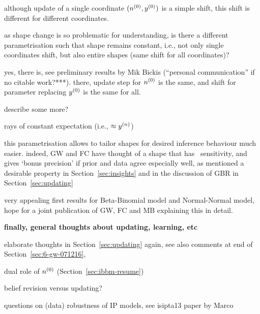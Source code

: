 although update of a single coordinate $(n^{(0)},y^{(0)})$ is a simple shift,
this shift is different for different coordinates.

as shape change is so problematic for understanding,
is there a different parametrisation such that shape remains constant,
i.e., not only single coordinates shift, but also entire shapes
(same shift for all coordinates)?

yes, there is, see preliminary results by Mik Bickis (``personal communication'' if no citable work?***).
there, update step for $n^{(0)}$ is the same, and shift for parameter replacing $y^{(0)}$ is the same for all. 

describe some more?

rays of constant expectation (i.e., $\approx y^{(n)}$)

this parametrisation allows to tailor shapes for desired inference behaviour much easier.
indeed, GW and FC have thought of a shape that has \pdc\ sensitivity,
and gives `bonus precision' if prior and data agree especially well,
as mentioned a desirable property in Section~\ref{sec:insights}
and in the discussion of GBR in Section~\ref{sec:updating}

very appealing first results for Beta-Binomial model and Normal-Normal model,
hope for a joint publication of GW, FC and MB explaining this in detail.


\textbf{finally, general thoughts about updating, learning, etc}

elaborate thoughts in Section~\ref{sec:updating} again,
see also comments at end of Section~\ref{sec:6-gw-071216},

dual role of $n^{(0)}$ (Section~\ref{sec:ibbm-resume})

belief revision versus updating?

questions on (data) robustness of IP models, see isipta13 paper by Marco


